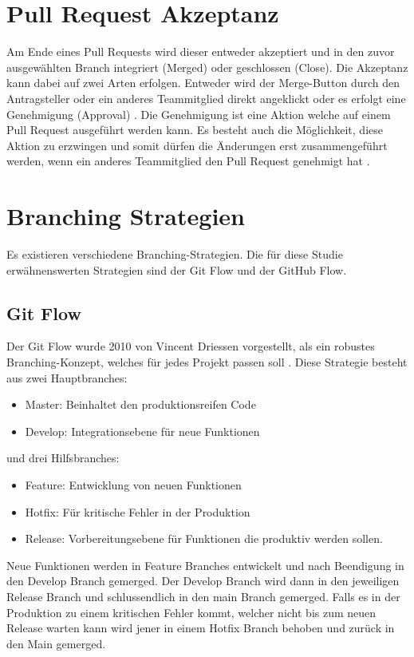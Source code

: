 \section{Pull Request Akzeptanz}
Am Ende eines Pull Requests wird dieser entweder akzeptiert und in den zuvor ausgewählten Branch integriert (Merged) oder geschlossen (Close)\parencite{noauthor_merging_nodate}\parencite{noauthor_closing_nodate}. Die Akzeptanz kann dabei auf zwei Arten erfolgen. Entweder wird der Merge-Button durch den Antragsteller oder ein anderes Teammitglied direkt angeklickt oder es erfolgt eine Genehmigung (Approval) \parencite{noauthor_merging_nodate}\parencite{noauthor_reviewing_nodate}. Die Genehmigung ist eine Aktion welche auf einem Pull Request ausgeführt werden kann. Es besteht auch die Möglichkeit, diese Aktion zu erzwingen und somit dürfen die Änderungen erst zusammengeführt werden, wenn ein anderes Teammitglied den Pull Request genehmigt hat \parencite{noauthor_approving_nodate}.

\section{Branching Strategien}
Es existieren verschiedene Branching-Strategien. Die für diese Studie erwähnenswerten Strategien sind der Git Flow und der GitHub Flow. \parencite{priyanka_gowdaashwath_narayana_gowda_git-branching-and-release-strategies_2022} 
\subsection{Git Flow}
Der Git Flow wurde 2010 von Vincent Driessen vorgestellt, als ein robustes Branching-Konzept, welches für jedes Projekt passen soll \parencite{priyanka_gowdaashwath_narayana_gowda_git-branching-and-release-strategies_2022}.
Diese Strategie besteht aus zwei Hauptbranches:
\begin{itemize}
    \item Master: Beinhaltet den produktionsreifen Code  
    \item Develop: Integrationsebene für neue Funktionen
\end{itemize}
und drei Hilfsbranches:
\begin{itemize}
    \item Feature: Entwicklung von neuen Funktionen
    \item Hotfix: Für kritische Fehler in der Produktion
    \item Release: Vorbereitungsebene für Funktionen die produktiv werden sollen.
\end{itemize}
Neue Funktionen werden in Feature Branches entwickelt und nach Beendigung in den Develop Branch gemerged. Der Develop Branch wird dann in den jeweiligen Release Branch und schlussendlich in den main Branch gemerged. Falls es in der Produktion zu einem kritischen Fehler kommt, welcher nicht bis zum neuen Release warten kann wird jener in einem Hotfix Branch behoben und zurück in den Main gemerged.
\parencite{priyanka_gowdaashwath_narayana_gowda_git-branching-and-release-strategies_2022}

